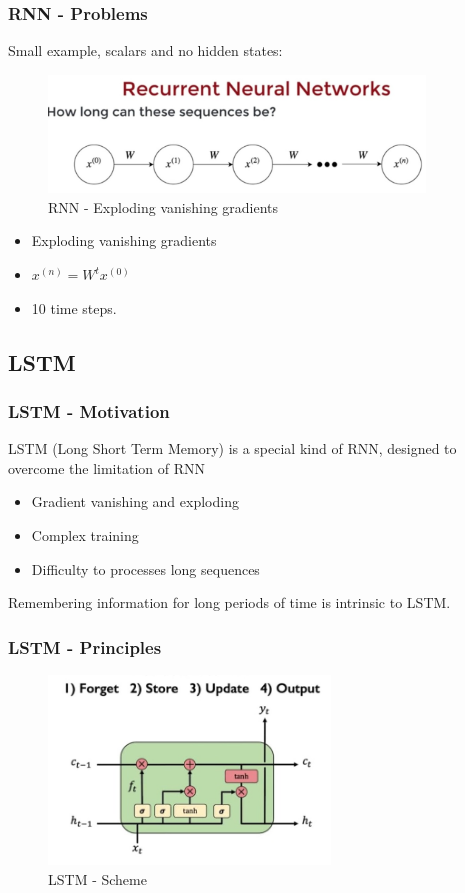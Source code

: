 \documentclass{article}
\begin{document}
\subsubsection{RNN - Problems}

Small example, scalars and no hidden states:
\begin{figure}[H]\centering\includegraphics[width=10cm]{Explode.jpeg}\caption{RNN - Exploding vanishing gradients}\end{figure}

\begin{itemize}
	\item Exploding vanishing gradients
	\item $x^{(n)} = W^t x^{(0)}$
	\item 10 time steps.
\end{itemize}

\newpage
\subsection{LSTM}


\subsubsection{LSTM - Motivation}

LSTM (Long Short Term Memory) is a special kind of RNN,  designed to overcome the limitation of RNN
\begin{itemize}
	\item Gradient vanishing and exploding
	\item Complex training
	\item Difficulty to processes long sequences 
\end{itemize}

Remembering information for long periods of time is intrinsic to LSTM.

\subsubsection{LSTM - Principles}


\begin{figure}[H]\centering\includegraphics[width=7.5cm]{LSTM_MAIN.jpeg}\caption{LSTM - Scheme}\end{figure}
\end{document}
